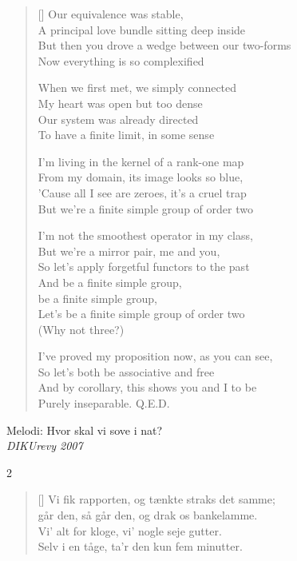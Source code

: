 {\begin{multicols}
\begin{verse}[\versewidth]
Our equivalence was stable,\\
A principal love bundle sitting deep inside\\
But then you drove a wedge between our two-forms\\
Now everything is so complexified
\columnbreak

When we first met, we simply connected\\
My heart was open but too dense\\
Our system was already directed\\
To have a finite limit, in some sense

I'm living in the kernel of a rank-one map\\
From my domain, its image looks so blue,\\
'Cause all I see are zeroes, it's a cruel trap\\
But we're a finite simple group of order two

I'm not the smoothest operator in my class,\\
But we're a mirror pair, me and you,\\
So let's apply forgetful functors to the past\\
And be a finite simple group,\\
be a finite simple group,\\
Let's be a finite simple group of order two\\
(Why not three?)

I've proved my proposition now, as you can see,\\
So let's both be associative and free\\
And by corollary, this shows you and I to be\\
Purely inseparable. Q.E.D.
\end{verse}
\end{multicols}

\newpage


{Melodi: Hvor skal vi sove i nat?}\\[.2em]
{\small\itshape DIKUrevy 2007}

{\setlength{\columnsep}{0pt}
\begin{multicols}2
\settowidth{\versewidth}{Vi emmed' af arrogancen og mistede chan}
\begin{verse}[\versewidth]
Vi fik rapporten, og tænkte straks det samme;\\
går den, så går den, og drak os bankelamme.\\
Vi' alt for kloge, vi' nogle seje gutter.\\
Selv i en tåge, ta'r den kun fem minutter.


\end{verse}
\end{multicols}}}
